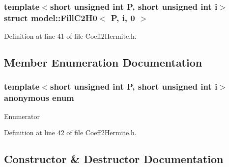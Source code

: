 \subsubsection*{template$<$short unsigned int P, short unsigned int i$>$struct model\+::\+Fill\+C2\+H0$<$ P, i, 0 $>$}



Definition at line 41 of file Coeff2\+Hermite.\+h.



\subsection{Member Enumeration Documentation}
\hypertarget{structmodel_1_1_fill_c2_h0_3_01_p_00_01i_00_010_01_4_a05b9c6963c4093568472a4fcdf4c8fb1}{}\subsubsection[{anonymous enum}]{\setlength{\rightskip}{0pt plus 5cm}template$<$short unsigned int P, short unsigned int i$>$ anonymous enum}\label{structmodel_1_1_fill_c2_h0_3_01_p_00_01i_00_010_01_4_a05b9c6963c4093568472a4fcdf4c8fb1}
\begin{Desc}
\item[Enumerator]\par
\begin{description}
\item[{\em 
\hypertarget{structmodel_1_1_fill_c2_h0_3_01_p_00_01i_00_010_01_4_a05b9c6963c4093568472a4fcdf4c8fb1aff1bb7489c1e539935fadc5a568743e4}{}j\label{structmodel_1_1_fill_c2_h0_3_01_p_00_01i_00_010_01_4_a05b9c6963c4093568472a4fcdf4c8fb1aff1bb7489c1e539935fadc5a568743e4}
}]\end{description}
\end{Desc}


Definition at line 42 of file Coeff2\+Hermite.\+h.



\subsection{Constructor \& Destructor Documentation}
\hypertarget{structmodel_1_1_fill_c2_h0_3_01_p_00_01i_00_010_01_4_a3b90905e3582299194efd8046509fb72}{}
